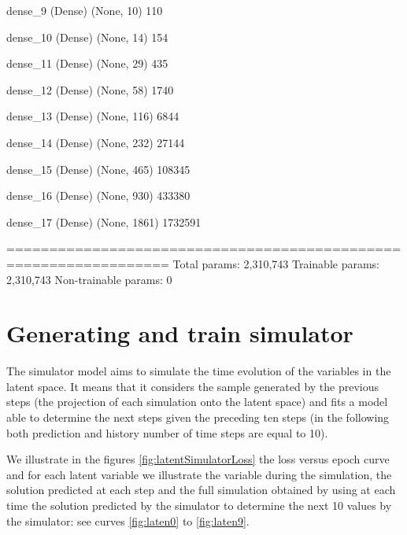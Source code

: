 \begin{asexample}
 dense_9 (Dense)             (None, 10)                110       
                                                                 
 dense_10 (Dense)            (None, 14)                154       
                                                                 
 dense_11 (Dense)            (None, 29)                435       
                                                                 
 dense_12 (Dense)            (None, 58)                1740      
                                                                 
 dense_13 (Dense)            (None, 116)               6844      
                                                                 
 dense_14 (Dense)            (None, 232)               27144     
                                                                 
 dense_15 (Dense)            (None, 465)               108345    
                                                                 
 dense_16 (Dense)            (None, 930)               433380    
                                                                 
 dense_17 (Dense)            (None, 1861)              1732591   
                                                                 
=================================================================
Total params: 2,310,743
Trainable params: 2,310,743
Non-trainable params: 0
\end{asexample}


\section{Generating and train simulator}

The simulator model aims to simulate the time evolution of the variables in the latent space. 
It means that it considers the sample generated by the previous steps (the projection of each simulation onto the latent space) 
and fits a model able to determine the next steps given the preceding ten steps (in the following both prediction and history number of time steps
are equal to 10).

We illustrate in the figures \ref{fig:latentSimulatorLoss} the loss versus epoch curve and for each latent variable we illustrate the variable during the simulation, the solution predicted at each step and the full simulation obtained by using at each time the solution predicted by the simulator to determine the next 10 values by the simulator: see curves \ref{fig:laten0} to \ref{fig:laten9}.

